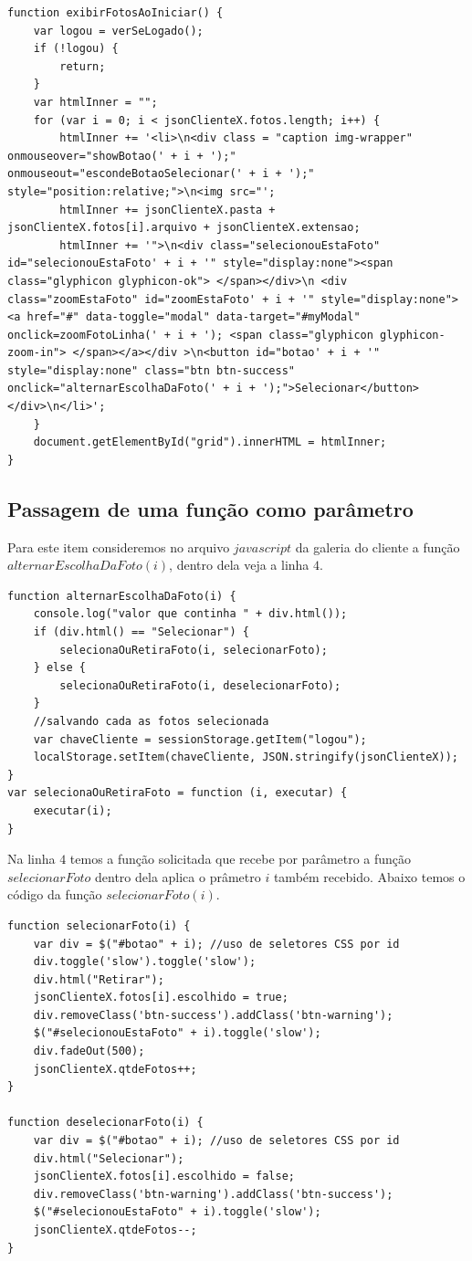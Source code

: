\begin{lstlisting}
function exibirFotosAoIniciar() {
    var logou = verSeLogado();
    if (!logou) {
        return;
    }
    var htmlInner = "";
    for (var i = 0; i < jsonClienteX.fotos.length; i++) {
        htmlInner += '<li>\n<div class = "caption img-wrapper" onmouseover="showBotao(' + i + ');" onmouseout="escondeBotaoSelecionar(' + i + ');" style="position:relative;">\n<img src="';
        htmlInner += jsonClienteX.pasta + jsonClienteX.fotos[i].arquivo + jsonClienteX.extensao;
        htmlInner += '">\n<div class="selecionouEstaFoto" id="selecionouEstaFoto' + i + '" style="display:none"><span class="glyphicon glyphicon-ok"> </span></div>\n <div class="zoomEstaFoto" id="zoomEstaFoto' + i + '" style="display:none"><a href="#" data-toggle="modal" data-target="#myModal" onclick=zoomFotoLinha(' + i + '); <span class="glyphicon glyphicon-zoom-in"> </span></a></div >\n<button id="botao' + i + '" style="display:none" class="btn btn-success" onclick="alternarEscolhaDaFoto(' + i + ');">Selecionar</button></div>\n</li>';
    }
    document.getElementById("grid").innerHTML = htmlInner;
}
\end{lstlisting}


\subsection{Passagem de uma função como parâmetro}
	Para este item consideremos no arquivo $javascript$ da galeria do cliente a função $alternarEscolhaDaFoto(i)$, dentro dela veja a linha $4$.	
	
\begin{lstlisting}	
function alternarEscolhaDaFoto(i) {
    console.log("valor que continha " + div.html());
    if (div.html() == "Selecionar") {
        selecionaOuRetiraFoto(i, selecionarFoto);
    } else {
        selecionaOuRetiraFoto(i, deselecionarFoto);
    }
    //salvando cada as fotos selecionada
    var chaveCliente = sessionStorage.getItem("logou");
    localStorage.setItem(chaveCliente, JSON.stringify(jsonClienteX));
}
var selecionaOuRetiraFoto = function (i, executar) {
    executar(i);
}

\end{lstlisting}
	Na linha $4$ temos a função solicitada que recebe por parâmetro a função $selecionarFoto$ dentro dela aplica o prâmetro $i$ também recebido. Abaixo temos o código da função $selecionarFoto(i)$.
	
\begin{lstlisting}
function selecionarFoto(i) {
    var div = $("#botao" + i); //uso de seletores CSS por id
    div.toggle('slow').toggle('slow');
    div.html("Retirar");
    jsonClienteX.fotos[i].escolhido = true;
    div.removeClass('btn-success').addClass('btn-warning');
    $("#selecionouEstaFoto" + i).toggle('slow');
    div.fadeOut(500);
    jsonClienteX.qtdeFotos++;
}

function deselecionarFoto(i) {
    var div = $("#botao" + i); //uso de seletores CSS por id
    div.html("Selecionar");
    jsonClienteX.fotos[i].escolhido = false;
    div.removeClass('btn-warning').addClass('btn-success');
    $("#selecionouEstaFoto" + i).toggle('slow');
    jsonClienteX.qtdeFotos--;
}	
	\end{lstlisting}

